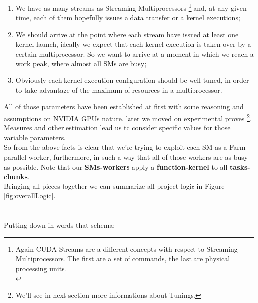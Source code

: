 	\begin{enumerate}
		\item We have as many streams as Streaming Multiprocessors \footnote{Again CUDA Streams are a different concepts with respect to Streaming Multiprocessors. The first are a set of commands, the last are physical processing units.\\} and, at any given time, each of them hopefully issues a data transfer or a kernel executions;
		\item We should arrive at the point where each stream have issued at least one kernel launch, ideally we expect that each kernel execution is taken over by a certain multiprocessor. So we want to arrive at a moment in which we reach a work peak, where almost all SMs are busy;
		\item Obviously each kernel execution configuration should be well tuned, in order to take advantage of the maximum of resources in a multiprocessor. 
	\end{enumerate}
	

	All of those parameters have been established at first with some reasoning and assumptions on NVIDIA GPUs nature, later we moved on experimental proves \footnote{We'll see in next section more informations about Tunings.}. Measures and other estimation lead us to consider specific values for those variable parameters.\\
	So from the above facts is clear that we're trying to exploit each SM as a Farm parallel worker, furthermore, in such a way that all of those workers are as busy as possible. Note that our \textbf{SMs-workers} apply a \textbf{function-kernel} to all \textbf{tasks-chunks}.\\
	Bringing all pieces together we can summarize all project logic in Figure \ref{fig:overallLogic}.\\\\\\
	Putting down in words that schema:
				
